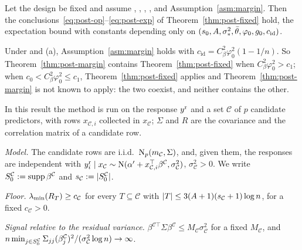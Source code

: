 \begin{theorem}\label{thm:post-margin}
Let the design be fixed and assume , , , ,  and Assumption~\ref{asm:margin}. Then
the conclusions~\eqref{eq:post-op}--\eqref{eq:post-exp} of Theorem~\ref{thm:post-fixed} hold, the expectation bound with
constants depending only on $(s_0,A,\sigma_*^2,\bar\theta,\varphi_0,g_0,c_{\mathrm{id}})$.
\end{theorem}


Under  and (a), Assumption~\ref{asm:margin} holds with $c_{\mathrm{id}}=C_\beta^2\varphi_0^2(1-1/n)$. So
Theorem~\ref{thm:post-margin} contains Theorem~\ref{thm:post-fixed} when $C_\beta^2\varphi_0^2>c_1$; when
$c_0<C_\beta^2\varphi_0^2\le c_1$, Theorem~\ref{thm:post-fixed} applies and Theorem~\ref{thm:post-margin} is not known to
apply: the two coexist, and neither contains the other.


In this result the method is run on the response $y^{\mathrm r}$ and a set $\mathcal C$ of $p$ candidate predictors, with rows
$x_{\mathcal C,i}$ collected in $x_{\mathcal C}$; $\Sigma$ and $R$ are the covariance and the correlation matrix of a
candidate row.

\begin{localassumption}\label{asm:omitted}
\begin{asmitems}
  \item \emph{Model.} The candidate rows are i.i.d.\ $\mathrm{N}_p(m_{\mathcal C},\Sigma)$, and, given them, the responses are
    independent with $y^{\mathrm r}_i\mid x_{\mathcal C}\sim\mathrm{N}(\alpha'+x_{\mathcal C,i}^\top\beta^{\mathcal C},\sigma^2_{\mathcal C})$,
    $\sigma^2_{\mathcal C}>0$. We write $S_0^{\mathcal C}:=\operatorname{supp}\beta^{\mathcal C}$ and $s_{\mathcal C}:=\lvert S_0^{\mathcal C}\rvert$.
  \item \emph{Floor.} $\lambda_{\min}(R_T)\ge c_{\mathcal C}$ for every $T\subseteq\mathcal C$ with
    $\lvert T\rvert\le3(A+1)(s_{\mathcal C}+1)\log n$, for a fixed $c_{\mathcal C}>0$.
  \item \emph{Signal relative to the residual variance.} $\beta^{\mathcal C\top}\Sigma\beta^{\mathcal C}\le
    M_{\mathcal C}\sigma^2_{\mathcal C}$ for a fixed $M_{\mathcal C}$, and $n\min_{j\in S_0^{\mathcal C}}\Sigma_{jj}(\beta^{\mathcal
    C}_j)^2/(\sigma^2_{\mathcal C}\log n)\to\infty$.
\end{asmitems}
\end{localassumption}

